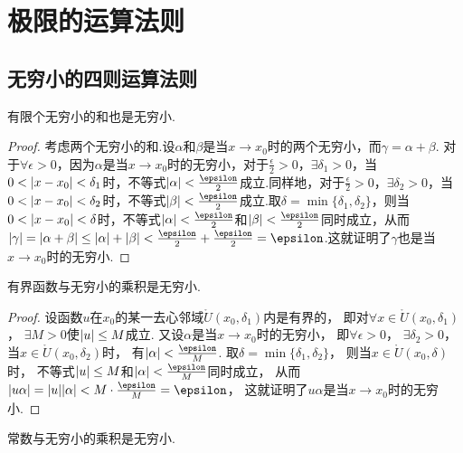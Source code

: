 \section{极限的运算法则}\label{section:极限.极限的运算法则}
\subsection{无穷小的四则运算法则}
\begin{theorem}
有限个无穷小的和也是无穷小.
\begin{proof}
考虑两个无穷小的和.设\(\alpha\)和\(\beta\)是当\(x \to x_0\)时的两个无穷小，而\(\gamma = \alpha+\beta\).
对于\(\forall\epsilon>0\)，因为\(\alpha\)是当\(x \to x_0\)时的无穷小，对于\(\frac{\epsilon}{2}>0\)，\(\exists \delta_1 > 0\)，当\(0<\abs{x-x_0}<\delta_1\)时，不等式\(\abs{\alpha}<\frac{\epsilon}{2}\)成立.同样地，对于\(\frac{\epsilon}{2}>0\)，\(\exists \delta_2 > 0\)，当\(0<\abs{x-x_0}<\delta_2\)时，不等式\(\abs{\beta}<\frac{\epsilon}{2}\)成立.取\(\delta=\min\{\delta_1,\delta_2\}\)，则当\(0<\abs{x-x_0}<\delta\)时，不等式\(\abs{\alpha}<\frac{\epsilon}{2}\)和\(\abs{\beta}<\frac{\epsilon}{2}\)同时成立，从而\(\abs{\gamma}=\abs{\alpha+\beta}\leq\abs{\alpha}+\abs{\beta}<\frac{\epsilon}{2}+\frac{\epsilon}{2}=\epsilon\).这就证明了\(\gamma\)也是当\(x \to x_0\)时的无穷小.
\end{proof}
\end{theorem}

\begin{theorem}
有界函数与无穷小的乘积是无穷小.
\begin{proof}
设函数\(u\)在\(x_0\)的某一去心邻域\(\mathring{U}(x_0,\delta_1)\)内是有界的，
即对\(\forall x\in\mathring{U}(x_0,\delta_1)\)，
\(\exists M>0\)使\(\abs{u} \leq M\)成立.
又设\(\alpha\)是当\(x \to x_0\)时的无穷小，
即\(\forall \epsilon > 0\)，
\(\exists \delta_2 > 0\)，
当\(x\in\mathring{U}(x_0,\delta_2)\)时，
有\(\abs{\alpha}<\frac{\epsilon}{M}\).
取\(\delta=\min\{\delta_1,\delta_2\}\)，
则当\(x\in\mathring{U}(x_0,\delta)\)时，
不等式\(\abs{u} \leq M\)和\(\abs{\alpha} < \frac{\epsilon}{M}\)同时成立，
从而\(\abs{u \alpha} = \abs{u}\abs{\alpha} < M \cdot \frac{\epsilon}{M} = \epsilon\)，
这就证明了\(u \alpha\)是当\(x \to x_0\)时的无穷小.
\end{proof}
\end{theorem}

\begin{corollary}
常数与无穷小的乘积是无穷小.
\end{corollary}

